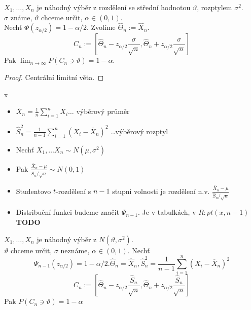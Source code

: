 \documentclass[../main.tex]{subfiles}
\begin{document}
\begin{theorem}
    $X_1,\dots,X_n$ je náhodný výběr z rozdělení se střední hodnotou $\vartheta$, rozptylem $\sigma^2$.\\
    $\sigma$ známe, $\vartheta$ chceme určit, $\alpha \in (0,1)$.\\
    Nechť $\Phi(z_{\alpha/2}) = 1 - \alpha / 2$. Zvolíme $\widehat{\Theta}_n := \widehat{X}_n$.
    \[C_n := \left[\widehat{\Theta}_n - z_{\alpha/2}\frac{\sigma}{\sqrt{n}}, \widehat{\Theta}_n + z_{\alpha/2}\frac{\sigma}{\sqrt{n}}\right]\]
    Pak $\lim_{n \rightarrow \infty} P(C_n \ni \vartheta) = 1 - \alpha$.
\end{theorem}
\begin{proof}
    Centrální limitní věta.
\end{proof}

\begin{definition}
    {\color{white} x}
    \begin{itemize}
        \item $\overline{X}_n = \frac{1}{n} \sum^n_{i=1} X_i \dots$ výběrový průměr
        \item $\widehat{S}^2_n = \frac{1}{n-1}\sum^n_{i=1} (X_i - \overline{X}_n)^2$ \dots výběrový rozptyl
    \end{itemize}
    \begin{itemize}
        \item Nechť $X_1, \dots X_n \sim N(\mu,\sigma^2)$
        \item Pak $\frac{\overline{X}_n - \mu}{\widehat{S}_n/\sqrt{n}} \sim N(0,1)$
        \item Studentovo $t$-rozdělení s $n-1$ stupni volnosti je rozdělení n.v. $\frac{\overline{X}_n - \mu}{\widehat{S}_n/\sqrt{n}}$
        \item Distribuční funkci budeme značit $\Psi_{n-1}$. Je v tabulkách, v $R:pt(x,n-1)$\textbf{TODO}
    \end{itemize}
\end{definition}

\begin{theorem}
    $X_1,\dots,X_n$ je náhodný výběr z $N(\vartheta,\sigma^2)$.\\
    $\vartheta$ chceme určit, $\sigma$ neznáme, $\alpha \in (0,1).$ Nechť
    \[\Psi_{n-1}(z_{\alpha/2}) = 1 - \alpha/2. \widehat{\Theta}_n = \widehat{X}_n, \widehat{S}^2_n = \frac{1}{n-1} \sum^n_{i=1} (X_i - \overline{X}_n)^2\]
    \[C_n := \left[\widehat{\Theta}_n - z_{\alpha/2} \frac{\widehat{S}_n}{\sqrt{n}}, \widehat{\Theta}_n + z_{\alpha/2}\frac{\widehat{S}_n}{\sqrt{n}}\right]\]
    Pak $P(C_n \ni \vartheta) = 1 - \alpha$
\end{theorem}
\end{document}
